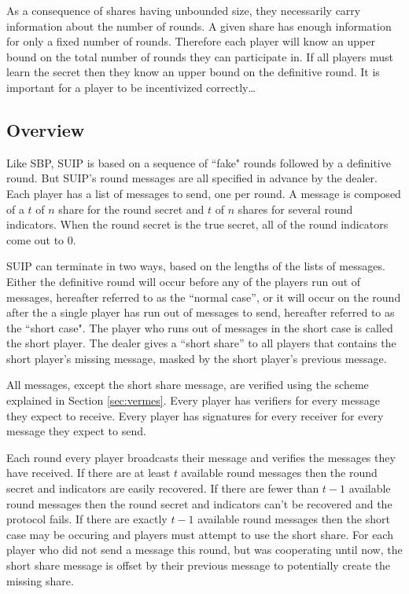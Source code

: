 \documentclass{dalcsthesis}
\begin{document}
As a consequence of shares having unbounded size, they necessarily carry information about the number of rounds. A given share has enough information for only a fixed number of rounds. Therefore each player will know an upper bound on the total number of rounds they can participate in. If all players must learn the secret then they know an upper bound on the definitive round. It is important for a player to be incentivized correctly\ldots

\subsection{Overview}

Like SBP, SUIP is based on a sequence of ``fake" rounds followed by a definitive round. But SUIP's round messages are all specified in advance by the dealer. Each player has a list of messages to send, one per round. A message is composed of a $t$ of $n$ share for the round secret and $t$ of $n$ shares for several round indicators. When the round secret is the true secret, all of the round indicators come out to 0.

SUIP can terminate in two ways, based on the lengths of the lists of messages. Either the definitive round will occur before any of the players run out of messages, hereafter referred to as the ``normal case'', or it will occur on the round after the a single player has run out of messages to send, hereafter referred to as the ``short case". The player who runs out of messages in the short case is called the short player. The dealer gives a ``short share'' to all players that contains the short player's missing message, masked by the short player's previous message.

All messages, except the short share message, are verified using the scheme explained in Section \ref{sec:vermes}. Every player has verifiers for every message they expect to receive. Every player has signatures for every receiver for every message they expect to send.

Each round every player broadcasts their message and verifies the messages they have received. If there are at least $t$ available round messages then the round secret and indicators are easily recovered. If there are fewer than $t-1$ available round messages then the round secret and indicators can't be recovered and the protocol fails. If there are exactly $t-1$ available round messages then the short case may be occuring and players must attempt to use the short share. For each player who did not send a message this round, but was cooperating until now, the short share message is offset by their previous message to potentially create the missing share.
\end{document}
